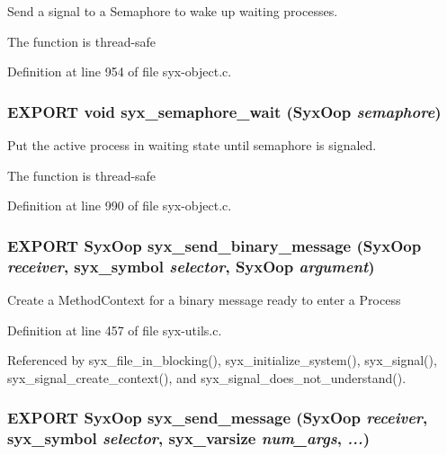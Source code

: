 Send a signal to a Semaphore to wake up waiting processes.

The function is thread-safe 

Definition at line 954 of file syx-object.c.\hypertarget{syx-utils_8h_44b0b96c5f8639eb3aa467b6dc440b6d}{
\subsubsection{\setlength{\rightskip}{0pt plus 5cm}EXPORT void syx\_\-semaphore\_\-wait ({\bf SyxOop} {\em semaphore})}}
\label{syx-utils_8h_44b0b96c5f8639eb3aa467b6dc440b6d}


Put the active process in waiting state until semaphore is signaled.

The function is thread-safe 

Definition at line 990 of file syx-object.c.\hypertarget{syx-utils_8h_61a3e2addfd2720091b195c9a29741a7}{
\subsubsection{\setlength{\rightskip}{0pt plus 5cm}EXPORT {\bf SyxOop} syx\_\-send\_\-binary\_\-message ({\bf SyxOop} {\em receiver}, \/  {\bf syx\_\-symbol} {\em selector}, \/  {\bf SyxOop} {\em argument})}}
\label{syx-utils_8h_61a3e2addfd2720091b195c9a29741a7}


Create a MethodContext for a binary message ready to enter a Process 

Definition at line 457 of file syx-utils.c.

Referenced by syx\_\-file\_\-in\_\-blocking(), syx\_\-initialize\_\-system(), syx\_\-signal(), syx\_\-signal\_\-create\_\-context(), and syx\_\-signal\_\-does\_\-not\_\-understand().\hypertarget{syx-utils_8h_1c63f0484b51652efbaecb22a6a5d2ed}{
\subsubsection{\setlength{\rightskip}{0pt plus 5cm}EXPORT {\bf SyxOop} syx\_\-send\_\-message ({\bf SyxOop} {\em receiver}, \/  {\bf syx\_\-symbol} {\em selector}, \/  {\bf syx\_\-varsize} {\em num\_\-args}, \/   {\em ...})}}
\label{syx-utils_8h_1c63f0484b51652efbaecb22a6a5d2ed}


